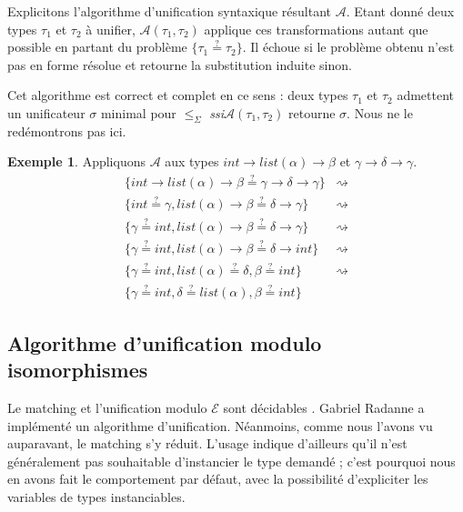 \documentclass[a4paper]{report}
\theoremstyle{definition}
\newtheorem{exemple}[theoreme]{Exemple}
\newcommand{\qeq}{\stackrel {\scriptscriptstyle ?} =}
\newcommand{\ssi}{\textit{ssi}\xspace}
\newcommand{\E}{\mathscr{E}}
\begin{document}
Explicitons l'algorithme d'unification syntaxique résultant $\mathscr{A}$. Etant donné deux types $\tau_1$ et $\tau_2$ à unifier, $\mathscr{A} (\tau_1, \tau_2)$ applique ces transformations autant que possible en partant du problème $\{ \tau_1 \qeq \tau_2 \}$. Il échoue si le problème obtenu n'est pas en forme résolue et retourne la substitution induite sinon.

Cet algorithme est correct et complet en ce sens : deux types $\tau_1$ et $\tau_2$ admettent un unificateur $\sigma$ minimal pour $\leqslant_\Sigma$ \ssi $\mathscr{A} (\tau_1, \tau_2)$ retourne $\sigma$. Nous ne le redémontrons pas ici.

\begin{exemple}
  Appliquons $\mathscr{A}$ aux types $int \rightarrow list (\alpha) \rightarrow \beta$ et $\gamma \rightarrow \delta \rightarrow \gamma$.
  \begin{align}
      \{ int \rightarrow list (\alpha) \rightarrow \beta \qeq \gamma \rightarrow \delta \rightarrow \gamma \} &\rightsquigarrow
      \tag{decomposer-$\rightarrow$}
    \\
      \{ int \qeq \gamma, list (\alpha) \rightarrow \beta \qeq \delta \rightarrow \gamma \} &\rightsquigarrow
      \tag{orienter}
    \\
      \{ \gamma \qeq int, list (\alpha) \rightarrow \beta \qeq \delta \rightarrow \gamma \} &\rightsquigarrow
      \tag{substituer}
    \\
      \{ \gamma \qeq int, list (\alpha) \rightarrow \beta \qeq \delta \rightarrow int \} &\rightsquigarrow
      \tag{décomposer-$\rightarrow$}
    \\
      \{ \gamma \qeq int, list (\alpha) \qeq \delta, \beta \qeq int \} &\rightsquigarrow
      \tag{orienter}
    \\
      \{ \gamma \qeq int, \delta \qeq list (\alpha), \beta \qeq int \}
      \tag*{en forme résolue}
  \end{align}
\end{exemple}


\subsection{Algorithme d'unification modulo isomorphismes}

Le matching et l'unification modulo $\E$ sont décidables \cite{Narendran_Pfenning_Statman}. Gabriel Radanne a implémenté un algorithme d'unification. Néanmoins, comme nous l'avons vu auparavant, le matching s'y réduit. L'usage indique d'ailleurs qu'il n'est généralement pas souhaitable d'instancier le type demandé ; c'est pourquoi nous en avons fait le comportement par défaut, avec la possibilité d'expliciter les variables de types instanciables.
\end{document}
